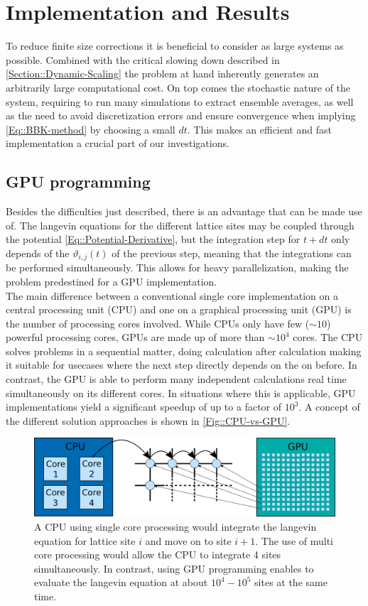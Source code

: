 	\chapter{Implementation and Results}
	To reduce finite size corrections it is beneficial to consider as large systems as possible. Combined with the critical slowing down described in  \autoref{Section::Dynamic-Scaling} the problem at hand inherently generates an arbitrarily large computational cost. On top comes the stochastic nature of the system, requiring to run many simulations to extract ensemble averages, as well as the need to avoid discretization errors and ensure convergence when implying \autoref{Eq::BBK-method} by choosing a small $dt$. This makes an efficient and fast implementation a crucial part of our investigations.
	\section{GPU programming}
	Besides the difficulties just described, there is an advantage that can be made use of. The langevin equations for the different lattice sites may be coupled through the potential \autoref{Eq::Potential-Derivative}, but the integration step for $t + dt$ only depends of the $\vartheta_{i, j}(t)$ of the previous step, meaning that the integrations can be performed simultaneously. This allows for heavy parallelization, making the problem predestined for a GPU implementation. \\
	
	The main difference between a conventional single core implementation on a central processing unit (CPU) and one on a graphical processing unit (GPU) is the number of processing cores involved. While CPUs only have few ($\sim 10$) powerful processing cores, GPUs are made up of more than $\sim 10^4$ cores. The CPU solves problems in a sequential matter, doing calculation after calculation making it suitable for usecases where the next step directly depends on the on before. In contrast, the GPU is able to perform many independent calculations real time simultaneously on its different cores. In situations where this is applicable, GPU implementations yield a significant speedup of up to a factor of $10^3$. A concept of the different solution approaches is shown in \autoref{Fig::CPU-vs-GPU}.\\
	\begin{figure}[htp]
		\centering
		\includegraphics[width=0.8\linewidth]{graphics/CPU-vs-GPU.png}
		\caption{A CPU using single core processing would integrate the langevin equation for lattice site $i$ and move on to site $i+1$. The use of multi core processing would allow the CPU to integrate 4 sites simultaneously. In contrast, using GPU programming enables to evaluate the langevin equation at about $10^4 - 10^5$ sites at the same time.}
		\label{Fig::CPU-vs-GPU}
	\end{figure}
	
